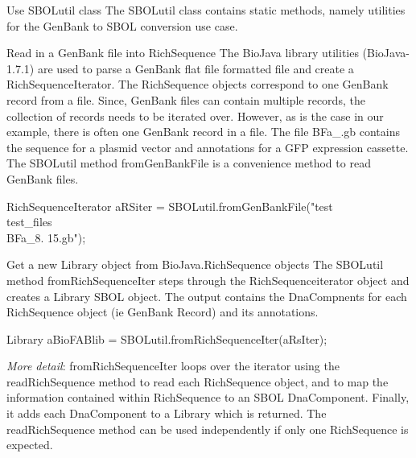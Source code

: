 \begin{DoxyEnumerate}
\item \begin{DoxyParagraph}{Use SBOLutil class}
The SBOLutil class contains static methods, namely utilities for the GenBank to SBOL conversion use case.
\end{DoxyParagraph}

\item \begin{DoxyParagraph}{Read in a GenBank file into RichSequence}
The BioJava library utilities (BioJava-\/1.7.1) are used to parse a GenBank flat file formatted file and create a RichSequenceIterator. The RichSequence objects correspond to one GenBank record from a file. Since, GenBank files can contain multiple records, the collection of records needs to be iterated over. However, as is the case in our example, there is often one GenBank record in a file. The file BFa\_.gb contains the sequence for a plasmid vector and annotations for a GFP expression cassette. The SBOLutil method fromGenBankFile is a convenience method to read GenBank files. 
\begin{DoxyCode}
RichSequenceIterator aRSiter = SBOLutil.fromGenBankFile("test\\test_files\\BFa_8.
      15.gb");
\end{DoxyCode}

\end{DoxyParagraph}

\item \begin{DoxyParagraph}{Get a new Library object from BioJava.RichSequence objects}
The SBOLutil method fromRichSequenceIter steps through the RichSequenceiterator object and creates a Library SBOL object. The output contains the DnaCompnents for each RichSequence object (ie GenBank Record) and its annotations. 
\begin{DoxyCode}
 Library aBioFABlib = SBOLutil.fromRichSequenceIter(aRsIter); 
\end{DoxyCode}
 {\itshape  More detail\/}: fromRichSequenceIter loops over the iterator using the readRichSequence method to read each RichSequence object, and to map the information contained within RichSequence to an SBOL DnaComponent. Finally, it adds each DnaComponent to a Library which is returned. The readRichSequence method can be used independently if only one RichSequence is expected.
\end{DoxyParagraph}


\end{DoxyEnumerate}
